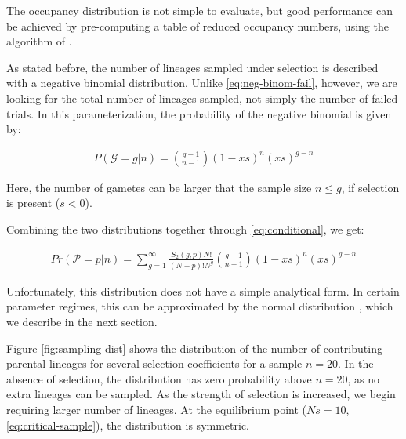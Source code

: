 \documentclass[review]{elsarticle}
\begin{document}
The occupancy distribution is not simple to evaluate, but good performance can be achieved by
pre-computing a table of reduced occupancy numbers, using the algorithm of \cite{ONeill2019}.

As stated before, the number of lineages sampled under selection is described with a negative
binomial distribution. Unlike \ref{eq:neg-binom-fail}, however, we are looking for the total number of
lineages sampled, not simply the number of failed trials. In this parameterization, the probability
of the negative binomial is given by:

\begin{align}
  \label{eq:neg-binomial-trials}
  P(\mathcal{G}=g|n) = \binom{g-1}{n-1}(1-xs)^n(xs)^{g-n}
\end{align}

Here, the number of gametes can be larger that the sample size $n \le g$, if selection is present
($s<0$).

Combining the two distributions together through \ref{eq:conditional}, we get:

\begin{align}
  \label{eq:lineages-in-past}
   Pr(\mathcal{P}=p|n) = \sum_{g=1}^{\infty} \frac{S_2(g,p) N!}{(N-p)! N^g} \binom{g-1}{n-1}(1-xs)^n(xs)^{g-n}
\end{align}

Unfortunately, this distribution does not have a simple analytical form. In certain parameter
regimes, this can be approximated by the normal distribution \cite{JohnsonEtAl2005,ONeill2019},
which we describe in the next section.

Figure \ref{fig:sampling-dist} shows the distribution of the number of contributing parental
lineages for several selection coefficients for a sample $n=20$. In the absence of selection, the
distribution has zero probability above $n=20$, as no extra lineages can be sampled. As the strength
of selection is increased, we begin requiring larger number of lineages. At the equilibrium point
($Ns=10$, \eqref{eq:critical-sample}), the distribution is symmetric.
\end{document}
